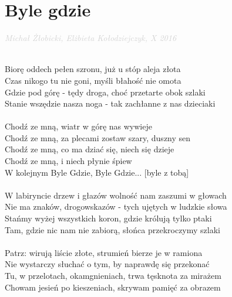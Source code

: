 \documentclass[a5paper, 10pt]{book}
\begin{document}
\section{Byle gdzie}\textcolor{lightgray}{\textit{Michał Żłobicki, Elżbieta Kołodziejczyk, X 2016}}\\
\begin{minipage}[t]{0.8\textwidth}
  ~\\
  Biorę oddech pełen szronu, już u stóp aleja złota		\\
  Czas nikogo tu nie goni, myśli błahość nie omota		\\
  Gdzie pod górę - tędy droga, choć przetarte obok szlaki\\
  Stanie wszędzie nasza noga - tak zachłanne z nas dzieciaki\\
  \\
  \hspace*{5mm}Chodź ze mną, wiatr w górę nas wywieje			\\
  \hspace*{5mm}Chodź ze mną, za plecami zostaw szary, duszny sen\\
  \hspace*{5mm}Chodź ze mną, co ma dziać się, niech się dzieje		\\
  \hspace*{5mm}Chodź ze mną, i niech płynie śpiew			\\
  \hspace*{5mm}W kolejnym Byle Gdzie, Byle Gdzie... [byle z tobą]\\
  \\
  W labiryncie drzew i głazów wolność nam zaszumi w głowach\\
  Nie ma znaków, drogowskazów - tych ujętych w ludzkie słowa\\
  Stańmy wyżej wszystkich koron, gdzie królują tylko ptaki\\
  Tam, gdzie nic nam nie zabiorą, słońca przekroczymy szlaki\\
  \\
  Patrz: wirują liście złote, strumień bierze je w ramiona\\
  Nie wystarczy słuchać o tym, by naprawdę się przekonać\\
  Tu, w przelotach, okamgnieniach, trwa tęsknota za mirażem\\
  Chowam jesień po kieszeniach, skrywam pamięć za obrazem\\
\end{minipage}
\end{document}
